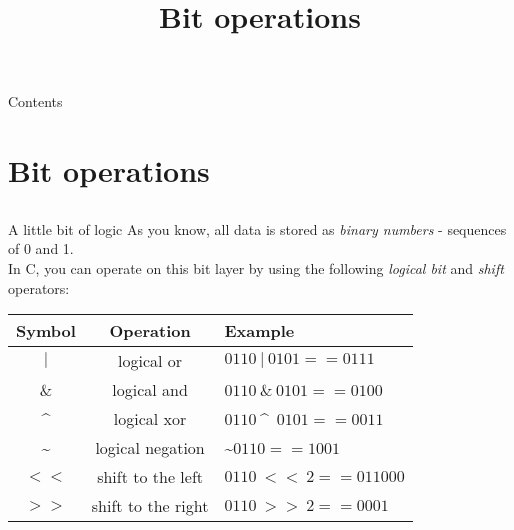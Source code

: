 
\newcommand{\topic}{
	Bit operations
}

\title{\topic}
\supertitle{\course}
\date{}



\maketitle

\begin{frame}{Contents}
	\tableofcontents
\end{frame}

\section{Bit operations}
\subsection{}

\begin{frame}{A little bit of logic}
	As you know, all data is stored as \textit{binary numbers} - sequences of 0 and 1.\\
	In C, you can operate on this bit layer by using the following \textit{logical bit} and \textit{shift} operators:\bigskip
	
	\begin{tabular}{|c|c|l|}
																						  	  \hline
		\textbf{Symbol} 	& \textbf{Operation} 	& \textbf{Example} 							\\\hline
		$|$					& logical or				& $0110\ |\ 0101 == 0111$ 		\\\hline
		$\&$ 				& logical and 				& $0110\ \&\ 0101 == 0100$ 	\\\hline
		\textasciicircum				& logical xor 				& $0110\ $\textasciicircum\ $0101 == 0011$ 	\\\hline
		\textasciitilde			& logical negation 			& \textasciitilde $0110 == 1001$	\\\hline
		$<<$ 			& shift to the left 			& $0110\ <<\ 2 == 011000$ 	\\\hline
		$>>$ 		& shift to the right 				& $0110\ >>\ 2 == 0001$ 			\\\hline
	\end{tabular}
	
\end{frame}

